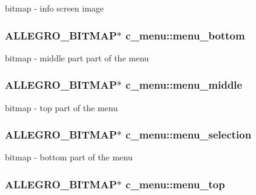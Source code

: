 bitmap -\/ info screen image \hypertarget{classc__menu_a74ca4baf7d4dbe8c0b6a4d2e52142ba4}{
\subsubsection[{menu\-\_\-bottom}]{\setlength{\rightskip}{0pt plus 5cm}A\-L\-L\-E\-G\-R\-O\-\_\-\-B\-I\-T\-M\-A\-P$\ast$ c\-\_\-menu\-::menu\-\_\-bottom\hspace{0.3cm}{\ttfamily [protected]}}}\label{classc__menu_a74ca4baf7d4dbe8c0b6a4d2e52142ba4}
bitmap -\/ middle part part of the menu \hypertarget{classc__menu_a2c6c75c1a53e6f375cadbda437cb99f5}{
\subsubsection[{menu\-\_\-middle}]{\setlength{\rightskip}{0pt plus 5cm}A\-L\-L\-E\-G\-R\-O\-\_\-\-B\-I\-T\-M\-A\-P$\ast$ c\-\_\-menu\-::menu\-\_\-middle\hspace{0.3cm}{\ttfamily [protected]}}}\label{classc__menu_a2c6c75c1a53e6f375cadbda437cb99f5}
bitmap -\/ top part of the menu \hypertarget{classc__menu_a7704ebdcc1c29c16e0b400ce9be6b933}{
\subsubsection[{menu\-\_\-selection}]{\setlength{\rightskip}{0pt plus 5cm}A\-L\-L\-E\-G\-R\-O\-\_\-\-B\-I\-T\-M\-A\-P$\ast$ c\-\_\-menu\-::menu\-\_\-selection\hspace{0.3cm}{\ttfamily [protected]}}}\label{classc__menu_a7704ebdcc1c29c16e0b400ce9be6b933}
bitmap -\/ bottom part of the menu \hypertarget{classc__menu_a0f70bbd0314bd3da93df8ab3f1df3a70}{
\subsubsection[{menu\-\_\-top}]{\setlength{\rightskip}{0pt plus 5cm}A\-L\-L\-E\-G\-R\-O\-\_\-\-B\-I\-T\-M\-A\-P$\ast$ c\-\_\-menu\-::menu\-\_\-top\hspace{0.3cm}{\ttfamily [protected]}}}\label{classc__menu_a0f70bbd0314bd3da93df8ab3f1df3a70}
